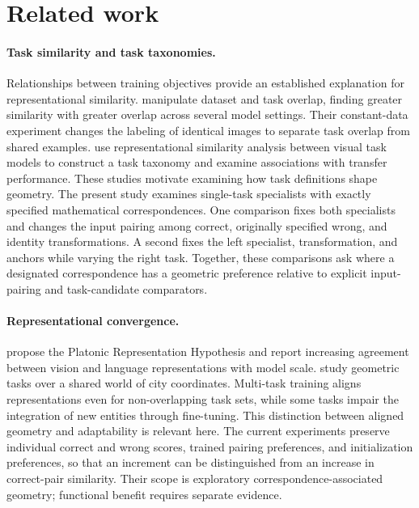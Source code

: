 \section{Related work}
\label{sec:related_work}

\paragraph{Task similarity and task taxonomies.}
Relationships between training objectives provide an established explanation for
representational similarity. \citet{li2025causes} manipulate dataset and task
overlap, finding greater similarity with greater overlap across several model
settings. Their constant-data experiment changes the labeling of identical
images to separate task overlap from shared examples.
\citet{dwivedi2019rsa} use representational similarity analysis between visual
task models to construct a task taxonomy and examine associations with transfer
performance. These studies motivate examining how task definitions shape
geometry. The present study examines single-task specialists with exactly
specified mathematical correspondences. One comparison fixes both specialists
and changes the input pairing among correct, originally specified wrong, and
identity transformations. A second fixes the left specialist, transformation,
and anchors while varying the right task. Together, these comparisons ask where
a designated correspondence has a geometric preference relative to explicit
input-pairing and task-candidate comparators.

\paragraph{Representational convergence.}
\citet{huh2024platonic} propose the Platonic Representation Hypothesis and report
increasing agreement between vision and language representations with model
scale. \citet{park2026convergent} study geometric tasks over a shared world of
city coordinates. Multi-task training aligns representations even for
non-overlapping task sets, while some tasks impair the integration of new
entities through fine-tuning. This distinction between aligned geometry and
adaptability is relevant here. The current experiments preserve individual
correct and wrong scores, trained pairing preferences, and initialization
preferences, so that an increment can be distinguished from an increase in
correct-pair similarity. Their scope is exploratory correspondence-associated
geometry; functional benefit requires separate evidence.

